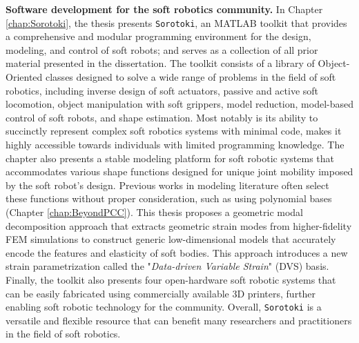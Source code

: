 \textbf{Software development for the soft robotics community.} In Chapter \ref{chap:Sorotoki}, the thesis presents \texttt{Sorotoki}, an MATLAB toolkit that provides a comprehensive and modular programming environment for the design, modeling, and control of soft robots; and  serves as a collection of all prior material presented in the dissertation. The toolkit consists of a library of Object-Oriented classes designed to solve a wide range of problems in the field of soft robotics, including inverse design of soft actuators, passive and active soft locomotion, object manipulation with soft grippers, model reduction, model-based control of soft robots, and shape estimation. Most notably is its ability to succinctly represent complex soft robotics systems with minimal code, makes it highly accessible towards individuals with limited programming knowledge. The chapter also presents a stable modeling platform for soft robotic systems that accommodates various shape functions designed for unique joint mobility imposed by the soft robot's design. Previous works in modeling literature often select these functions without proper consideration, such as using polynomial bases (Chapter \ref{chap:BeyondPCC}). This thesis proposes a geometric modal decomposition approach that extracts geometric strain modes from higher-fidelity FEM simulations to construct generic low-dimensional models that accurately encode the features and elasticity of soft bodies. This approach introduces a new strain parametrization called the "\textit{Data-driven Variable Strain}" (DVS) basis. Finally, the toolkit also presents four open-hardware soft robotic systems that can be easily fabricated using commercially available 3D printers, further enabling soft robotic technology for the community. Overall, \texttt{Sorotoki} is a versatile and flexible resource that can benefit many researchers and practitioners in the field of soft robotics.

